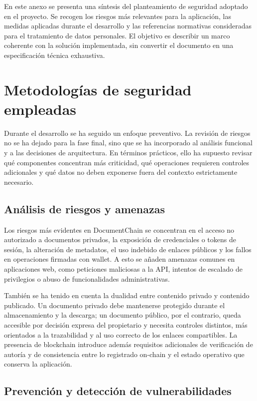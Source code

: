 \documentclass[11pt, a4paper]{article}
\begin{document}
En este anexo se presenta una síntesis del planteamiento de seguridad adoptado en el proyecto. Se recogen los riesgos más relevantes para la aplicación, las medidas aplicadas durante el desarrollo y las referencias normativas consideradas para el tratamiento de datos personales. El objetivo es describir un marco coherente con la solución implementada, sin convertir el documento en una especificación técnica exhaustiva.

\section{Metodologías de seguridad empleadas}

Durante el desarrollo se ha seguido un enfoque preventivo. La revisión de riesgos no se ha dejado para la fase final, sino que se ha incorporado al análisis funcional y a las decisiones de arquitectura. En términos prácticos, ello ha supuesto revisar qué componentes concentran más criticidad, qué operaciones requieren controles adicionales y qué datos no deben exponerse fuera del contexto estrictamente necesario.

\subsection{Análisis de riesgos y amenazas}

Los riesgos más evidentes en DocumentChain se concentran en el acceso no autorizado a documentos privados, la exposición de credenciales o tokens de sesión, la alteración de metadatos, el uso indebido de enlaces públicos y los fallos en operaciones firmadas con wallet. A esto se añaden amenazas comunes en aplicaciones web, como peticiones maliciosas a la API, intentos de escalado de privilegios o abuso de funcionalidades administrativas.

También se ha tenido en cuenta la dualidad entre contenido privado y contenido publicado. Un documento privado debe mantenerse protegido durante el almacenamiento y la descarga; un documento público, por el contrario, queda accesible por decisión expresa del propietario y necesita controles distintos, más orientados a la trazabilidad y al uso correcto de los enlaces compartibles. La presencia de blockchain introduce además requisitos adicionales de verificación de autoría y de consistencia entre lo registrado on-chain y el estado operativo que conserva la aplicación.

\subsection{Prevención y detección de vulnerabilidades}
\end{document}
